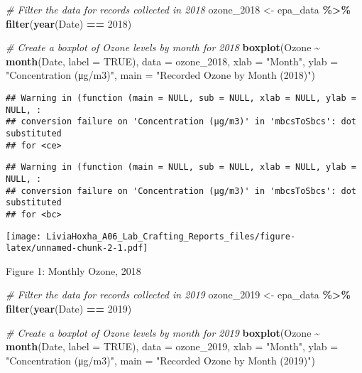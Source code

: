 \documentclass[
]{article}
\newenvironment{Shaded}{\begin{snugshade}}{\end{snugshade}}
\newcommand{\AttributeTok}[1]{\textcolor[rgb]{0.13,0.29,0.53}{#1}}
\newcommand{\CommentTok}[1]{\textcolor[rgb]{0.56,0.35,0.01}{\textit{#1}}}
\newcommand{\ConstantTok}[1]{\textcolor[rgb]{0.56,0.35,0.01}{#1}}
\newcommand{\DecValTok}[1]{\textcolor[rgb]{0.00,0.00,0.81}{#1}}
\newcommand{\FunctionTok}[1]{\textcolor[rgb]{0.13,0.29,0.53}{\textbf{#1}}}
\newcommand{\NormalTok}[1]{#1}
\newcommand{\OtherTok}[1]{\textcolor[rgb]{0.56,0.35,0.01}{#1}}
\newcommand{\SpecialCharTok}[1]{\textcolor[rgb]{0.81,0.36,0.00}{\textbf{#1}}}
\newcommand{\StringTok}[1]{\textcolor[rgb]{0.31,0.60,0.02}{#1}}
\begin{document}
\begin{Shaded}
\begin{Highlighting}[]
\CommentTok{\# Filter the data for records collected in 2018}
\NormalTok{ozone\_2018 }\OtherTok{\textless{}{-}}\NormalTok{ epa\_data }\SpecialCharTok{\%\textgreater{}\%} 
  \FunctionTok{filter}\NormalTok{(}\FunctionTok{year}\NormalTok{(Date) }\SpecialCharTok{==} \DecValTok{2018}\NormalTok{)}

\CommentTok{\# Create a boxplot of Ozone levels by month for 2018}
\FunctionTok{boxplot}\NormalTok{(Ozone }\SpecialCharTok{\textasciitilde{}} \FunctionTok{month}\NormalTok{(Date, }\AttributeTok{label =} \ConstantTok{TRUE}\NormalTok{), }\AttributeTok{data =}\NormalTok{ ozone\_2018, }
        \AttributeTok{xlab =} \StringTok{"Month"}\NormalTok{, }\AttributeTok{ylab =} \StringTok{"Concentration (μg/m3)"}\NormalTok{,}
        \AttributeTok{main =} \StringTok{"Recorded Ozone by Month (2018)"}\NormalTok{)}
\end{Highlighting}
\end{Shaded}

\begin{verbatim}
## Warning in (function (main = NULL, sub = NULL, xlab = NULL, ylab = NULL, :
## conversion failure on 'Concentration (μg/m3)' in 'mbcsToSbcs': dot substituted
## for <ce>
\end{verbatim}

\begin{verbatim}
## Warning in (function (main = NULL, sub = NULL, xlab = NULL, ylab = NULL, :
## conversion failure on 'Concentration (μg/m3)' in 'mbcsToSbcs': dot substituted
## for <bc>
\end{verbatim}

\texttt{[image: LiviaHoxha\_A06\_Lab\_Crafting\_Reports\_files/figure-latex/unnamed-chunk-2-1.pdf]}

Figure 1: Monthly Ozone, 2018

\begin{Shaded}
\begin{Highlighting}[]
\CommentTok{\# Filter the data for records collected in 2019}
\NormalTok{ozone\_2019 }\OtherTok{\textless{}{-}}\NormalTok{ epa\_data }\SpecialCharTok{\%\textgreater{}\%} 
  \FunctionTok{filter}\NormalTok{(}\FunctionTok{year}\NormalTok{(Date) }\SpecialCharTok{==} \DecValTok{2019}\NormalTok{)}

\CommentTok{\# Create a boxplot of Ozone levels by month for 2019}
\FunctionTok{boxplot}\NormalTok{(Ozone }\SpecialCharTok{\textasciitilde{}} \FunctionTok{month}\NormalTok{(Date, }\AttributeTok{label =} \ConstantTok{TRUE}\NormalTok{), }\AttributeTok{data =}\NormalTok{ ozone\_2019, }
        \AttributeTok{xlab =} \StringTok{"Month"}\NormalTok{, }\AttributeTok{ylab =} \StringTok{"Concentration (μg/m3)"}\NormalTok{,}
        \AttributeTok{main =} \StringTok{"Recorded Ozone by Month (2019)"}\NormalTok{)}
\end{Highlighting}
\end{Shaded}
\end{document}
